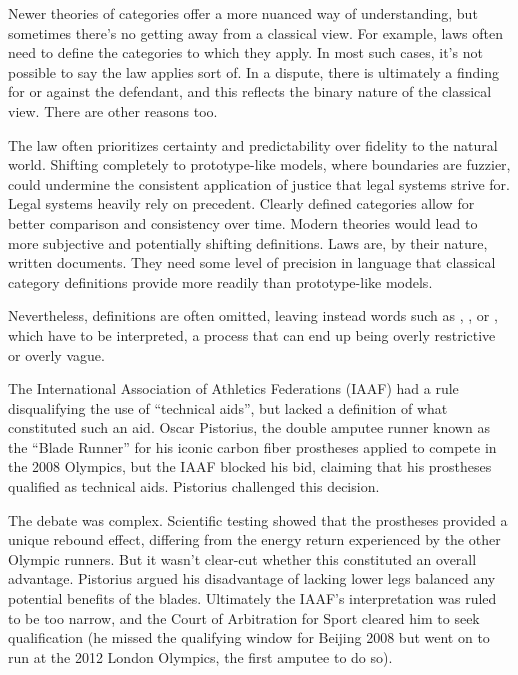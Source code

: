 Newer theories of categories offer a more nuanced way of understanding, but sometimes there's no getting away from a classical view. For example, laws often need to define the categories to which they apply. In most such cases, it's not possible to say the law applies sort of. In a dispute, there is ultimately a finding for or against the defendant, and this reflects the binary nature of the classical view. There are other reasons too.

The law often prioritizes certainty and predictability over fidelity to the natural world. Shifting completely to prototype-like models, where boundaries are fuzzier, could undermine the consistent application of justice that legal systems strive for. Legal systems heavily rely on precedent. Clearly defined categories allow for better comparison and consistency over time. Modern theories would lead to more subjective and potentially shifting definitions. Laws are, by their nature, written documents. They need some level of precision in language that classical category definitions provide more readily than prototype-like models.

Nevertheless, definitions are often omitted, leaving instead words such as , , or , which have to be interpreted, a process that can end up being overly restrictive or overly vague.

The International Association of Athletics Federations (IAAF) had a rule disqualifying the use of \enquote{technical aids}, but lacked a definition of what constituted such an aid. Oscar Pistorius, the double amputee runner known as the \enquote{Blade Runner} for his iconic carbon fiber prostheses applied to compete in the 2008 Olympics, but the IAAF blocked his bid, claiming that his prostheses qualified as technical aids. Pistorius challenged this decision.

The debate was complex. Scientific testing showed that the prostheses provided a unique rebound effect, differing from the energy return experienced by the other Olympic runners. But it wasn't clear-cut whether this constituted an overall advantage. Pistorius argued his disadvantage of lacking lower legs balanced any potential benefits of the blades. Ultimately the IAAF's interpretation was ruled to be too narrow, and the Court of Arbitration for Sport cleared him to seek qualification (he missed the qualifying window for Beijing 2008 but went on to run at the 2012 London Olympics, the first amputee to do so).

